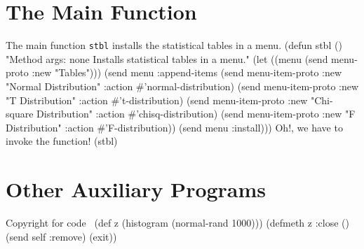 \section{The Main Function}
\label{sec:main-func}
The main function {\tt{}stbl} installs the statistical tables in a menu.
\nwenddocs{}\endmoddef
(defun stbl ()
"Method args: none
 Installs statistical tables in a menu."
  (let ((menu (send menu-proto :new "Tables")))
    (send menu :append-items
          (send menu-item-proto :new "Normal Distribution"
                :action #'normal-distribution)
          (send menu-item-proto :new "T Distribution"
                :action #'t-distribution)
          (send menu-item-proto :new "Chi-square Distribution"
                :action #'chisq-distribution)
          (send menu-item-proto :new "F Distribution"
                :action #'F-distribution))
    (send menu :install)))
\eatline
{}\nwendcode{}\nwdocspar
Oh!, we have to invoke the function!
\nwenddocs{}\endmoddef
(stbl)
\nwendcode{}\nwdocspar

\section{Other Auxiliary Programs}
\label{sec:programs}

\nwenddocs{}\endmoddef
\LA{}Copyright for code~{\nwtagstyle{}}\RA{}
(def z (histogram (normal-rand 1000)))
(defmeth z :close () (send self :remove) (exit))
\eatline
{}\nwendcode{}\nwdocspar

